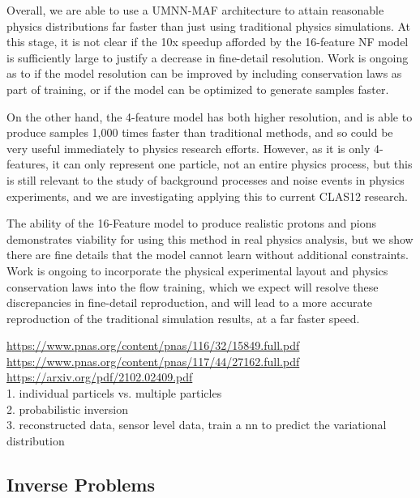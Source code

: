 Overall, we are able to use a UMNN-MAF architecture to attain reasonable physics distributions far faster than just using traditional physics simulations. At this stage, it is not clear if the 10x speedup afforded by the 16-feature NF model is sufficiently large to justify a decrease in fine-detail resolution. Work is ongoing as to if the model resolution can be improved by including conservation laws as part of training, or if the model can be optimized to generate samples faster. 

On the other hand, the 4-feature model has both higher resolution, and is able to produce samples 1,000 times faster than traditional methods, and so could be very useful immediately to physics research efforts. However, as it is only 4-features, it can only represent one particle, not an entire physics process, but this is still relevant to the study of background processes and noise events in physics experiments, and we are investigating applying this to current CLAS12 research.

The ability of the 16-Feature model to produce realistic protons and pions demonstrates viability for using this method in real physics analysis, but we show there are fine details that the model cannot learn without additional constraints. Work is ongoing to incorporate the physical experimental layout and physics conservation laws into the flow training, which we expect will resolve these discrepancies in fine-detail reproduction, and will lead to a more accurate reproduction of the traditional simulation results, at a far faster speed. 



\url{https://www.pnas.org/content/pnas/116/32/15849.full.pdf}\\
\url{https://www.pnas.org/content/pnas/117/44/27162.full.pdf}\\
\url{https://arxiv.org/pdf/2102.02409.pdf}
\\
1. individual particels vs. multiple particles\\
2. probabilistic inversion\\
3. reconstructed data, sensor level data, train a nn to predict the variational distribution\\

\subsection{Inverse Problems}

